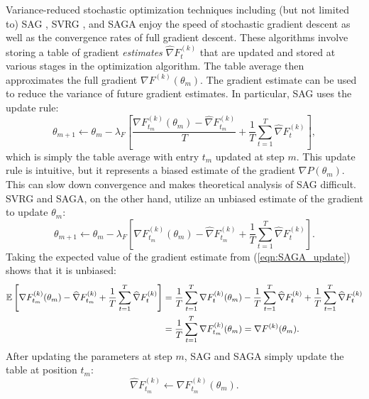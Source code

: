 Variance-reduced stochastic optimization techniques including (but not limited to) SAG \citep{Schmidt:2017}, SVRG \citep{Johnson:2013}, and SAGA \citep{Defazio:2014} enjoy the speed of stochastic gradient descent as well as the convergence rates of full gradient descent. These algorithms involve storing a table of gradient \textit{estimates} $\widehat \nabla F^{(k)}_t$ that are updated and stored at various stages in the optimization algorithm. The table average then approximates the full gradient $\nabla F^{(k)}(\theta_{m})$. The gradient estimate can be used to reduce the variance of future gradient estimates. In particular, SAG uses the update rule:
%
\begin{equation}
    \theta_{m+1} \gets \theta_{m} - \lambda_F \left[\frac{\nabla F^{(k)}_{t_m}(\theta_{m}) - \widehat \nabla F^{(k)}_{t_m}}{T} + \frac{1}{T} \sum_{t=1}^T \widehat \nabla F^{(k)}_{t} \right], \label{eqn:SAG_update}
\end{equation}
%
which is simply the table average with entry $t_m$ updated at step $m$. This update rule is intuitive, but it represents a biased estimate of the gradient $\nabla P(\theta_m)$. This can slow down convergence and makes theoretical analysis of SAG difficult. SVRG and SAGA, on the other hand, utilize an unbiased estimate of the gradient to update $\theta_m$:
%
\begin{equation}
    \theta_{m+1} \gets \theta_{m} - \lambda_F \left[\nabla F^{(k)}_{t_m}(\theta_{m}) - \widehat \nabla F^{(k)}_{t_m} + \frac{1}{T} \sum_{t=1}^T \widehat \nabla F^{(k)}_{t} \right].
    \label{eqn:SAGA_update}
\end{equation}
%
Taking the expected value of the gradient estimate from (\ref{eqn:SAGA_update}) shows that it is unbiased:
%
\begin{align*}
    \mathbb{E}\left[\nabla F^{(k)}_{t_m}(\theta_{m}) - \widehat \nabla F^{(k)}_{t_m} + \frac{1}{T} \sum_{t=1}^T \widehat \nabla F^{(k)}_{t} \right] &= \frac{1}{T} \sum_{t=1}^T \nabla F^{(k)}_{t}(\theta_{m}) - \frac{1}{T} \sum_{t=1}^T \widehat \nabla F^{(k)}_{t} + \frac{1}{T} \sum_{t=1}^T \widehat \nabla F^{(k)}_{t} \\
    &= \frac{1}{T} \sum_{t=1}^T \nabla F^{(k)}_{t_m}(\theta_{m}) = \nabla F^{(k)}(\theta_{m}).
\end{align*}
%
After updating the parameters at step $m$, SAG and SAGA simply update the table at position $t_m$: 
%
\begin{equation}
    \widehat \nabla F^{(k)}_{t_m} \leftarrow \nabla F^{(k)}_{t_m}(\theta_{m}).
\end{equation}
